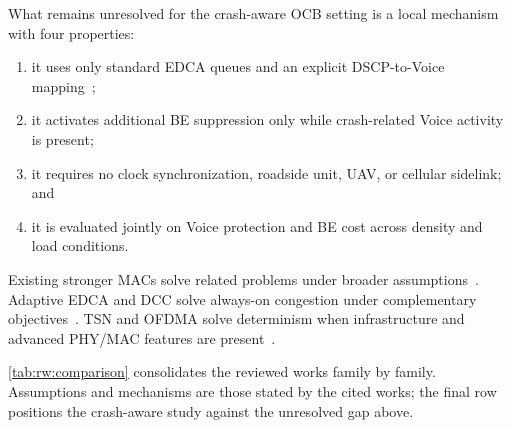 What remains unresolved for the crash-aware OCB setting is a local mechanism with four properties:
\begin{enumerate}
  \item it uses only standard EDCA queues and an explicit DSCP-to-Voice mapping~\cite{RFC8325_WiFi_QoS,IEEE80211e_2005};
  \item it activates additional BE suppression only while crash-related Voice activity is present;
  \item it requires no clock synchronization, roadside unit, UAV, or cellular sidelink; and
  \item it is evaluated jointly on Voice protection and BE cost across density and load conditions.
\end{enumerate}

Existing stronger MACs solve related problems under broader assumptions~\cite{TSNCtl_Feraudo,PRP_MAC_Li,CFC_MAC_Linn,CV2X_Sidelink_Allocation}.
Adaptive EDCA and DCC solve always-on congestion under complementary objectives~\cite{romdhani2003AdaptiveEDCF,etsi_dcc_2018}.
TSN and OFDMA solve determinism when infrastructure and advanced PHY/MAC features are present~\cite{ieee8021qbv,schneider_trigger_2024}.

\autoref{tab:rw:comparison} consolidates the reviewed works family by family.
Assumptions and mechanisms are those stated by the cited works; the final row positions the crash-aware study against the unresolved gap above.

